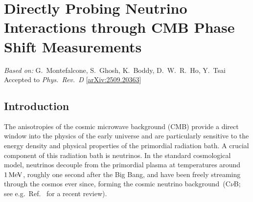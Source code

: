 \chapter{Directly Probing Neutrino Interactions through CMB Phase Shift Measurements}
\label{ch:neutrino-interactions}

\begin{center}
\textit{Based on:} G.~Montefalcone, S.~Ghosh, K.~Boddy, D.~W.~R.~Ho, Y.~Tsai\\
Accepted to \textit{Phys.\ Rev.\ D}
[\href{https://arxiv.org/abs/2509.20363}{arXiv:2509.20363}]
\end{center}
\vspace{1em}

\providecommand{\Neff}{N_\mathrm{eff}}

\section{Introduction}
\label{sec:ch13-intro}

\noindent The anisotropies of the cosmic microwave background (CMB) provide a direct window into the physics of the early universe and are particularly sensitive to the energy density and physical properties of the primordial radiation bath. A crucial component of this radiation bath is neutrinos. In the standard cosmological model, neutrinos decouple from the primordial plasma at temperatures around $1\,{\rm MeV}$, roughly one second after the Big Bang, and have been freely streaming through the cosmos ever since, forming the cosmic neutrino background~(C$\nu$B; see e.g.\ Ref.~\cite{Scott:2024rwc} for a recent review).

